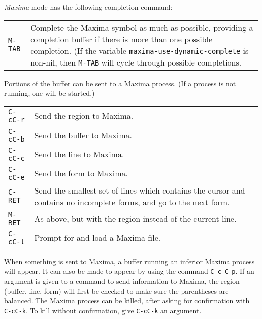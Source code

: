 \documentclass{article}
\newcommand{\mx}{\textsl{\sffamily Maxima}}
\begin{document}
\noindent
\mx{} mode has the following completion command:

\begin{tabular}{p{\firstcol}p{\secondcol}}
\texttt{M-TAB} & Complete the Maxima symbol as much as possible, providing
     a completion buffer if there is more than one possible
     completion.  (If the variable
     \texttt{maxima-use-dynamic-complete} is non-nil, then
     \texttt{M-TAB} will cycle through possible completions.
\end{tabular}

Portions of the buffer can be sent to a Maxima process.  (If a process is 
not running, one will be started.)

\begin{tabular}{p{\firstcol}p{\secondcol}}
\texttt{C-cC-r} & Send the region to Maxima.\\
\texttt{C-cC-b} & Send the buffer to Maxima.\\
\texttt{C-cC-c} & Send the line to Maxima.\\
\texttt{C-cC-e} & Send the form to Maxima.\\
\texttt{C-RET} & Send the smallest set of lines which contains
the cursor and contains no incomplete forms, and go to the next form.\\
\texttt{M-RET} &  As above, but with the region instead of the current line.\\
\texttt{C-cC-l} & Prompt for and load a Maxima file.
\end{tabular}

\noindent
When something is sent to Maxima, a buffer running an inferior Maxima 
process will appear.  It can also be made to appear by using the command
\texttt{C-c C-p}.
If an argument is given to a command to send information to Maxima,
the region (buffer, line, form) will first be checked to make sure
the parentheses are balanced.
The Maxima process can be killed, after asking for confirmation 
with \texttt{C-cC-k}.  To kill without confirmation, give \texttt{C-cC-k}
an argument.
\end{document}
